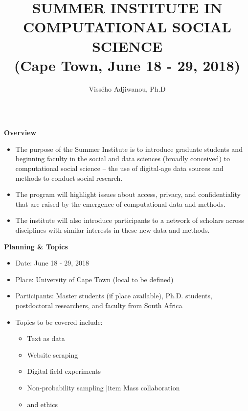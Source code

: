 \documentclass{beamer}
\author[cssforafrica@gmail.com / https://compsocialscience.github.io/summer-institute/2018/capetown/]{Vissého Adjiwanou, Ph.D}
\title{SUMMER INSTITUTE IN COMPUTATIONAL SOCIAL SCIENCE\\(Cape Town, June 18 - 29, 2018)}
\institute{University of Cape Town}
\begin{document}
\begin{frame}[fragile]
\begin{columns}[T]

\begin{column}{.48\textwidth}

\begin{block}{\textbf{Overview}}
\begin{itemize}
\item The purpose of the Summer Institute is to introduce graduate students and beginning faculty in the social and data sciences (broadly conceived) to computational social science – the use of digital-age data sources and methods to conduct social
research.
\item The program will highlight issues about access, privacy, and confidentiality that are raised by the emergence
of computational data and methods. 
\item The institute will also introduce participants to a network of scholars across disciplines with similar interests in these new data and methods.
\end{itemize}
\end{block}

\begin{block}{\textbf{Planning \& Topics}}
\begin{itemize}
\item Date: June 18 - 29, 2018
\item Place: University of Cape Town (local to be defined)
\item Participants: Master students (if place available), Ph.D. students, postdoctoral researchers, and faculty from South Africa
\item Topics to be covered include:
	\begin{itemize}
	\item Text as data
    \item Website scraping
    \item Digital field experiments
    \item Non-probability sampling
    |item Mass collaboration
    \item and ethics
	\end{itemize}  
\end{itemize}
\end{block}


\end{column}
\end{columns}
\end{frame}
\end{document}
